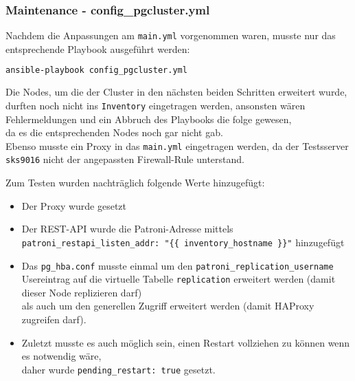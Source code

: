 \begin{flushleft}
    \subsubsection{Maintenance - config\_pgcluster.yml}
    Nachdem die Anpassungen am \texttt{main.yml} vorgenommen waren, musste nur das entsprechende Playbook ausgeführt werden:
    \lstset{style=gra_codestyle}
    \begin{lstlisting}[language=bash, caption=Maintenance - config\_pgcluster.yml,captionpos=b,label={lst:config-pgcluster},breaklines=true]
ansible-playbook config_pgcluster.yml
    \end{lstlisting}
    \begin{warning}
        Die Nodes, um die der Cluster in den nächsten beiden Schritten erweitert wurde,\\
        durften noch nicht ins \texttt{Inventory} eingetragen werden, ansonsten wären Fehlermeldungen und ein Abbruch des Playbooks die folge gewesen,\\da es die entsprechenden Nodes noch gar nicht gab.\\
        Ebenso musste ein Proxy in das \texttt{main.yml} eingetragen werden, da der Testsserver \texttt{sks9016} nicht der angepassten Firewall-Rule unterstand.
    \end{warning}
\begin{flushleft}
    Zum Testen wurden nachträglich folgende Werte hinzugefügt:
    \begin{itemize}
        \item Der Proxy wurde gesetzt
        \item Der REST-API wurde die Patroni-Adresse mittels \texttt{patroni\_restapi\_listen\_addr: "\{\{ inventory\_hostname \}\}"} hinzugefügt
        \item Das \texttt{pg\_hba.conf} musste einmal um den \texttt{patroni\_replication\_username} Usereintrag auf die virtuelle Tabelle \texttt{replication} erweitert werden (damit dieser Node replizieren darf)\\als auch um den generellen Zugriff erweitert werden (damit \Gls{HAProxy} zugreifen darf).
        \item Zuletzt musste es auch möglich sein, einen Restart vollziehen zu können wenn es notwendig wäre,\\daher wurde \texttt{pending\_restart: true} gesetzt.
    \end{itemize}
\end{flushleft}

\end{flushleft}

